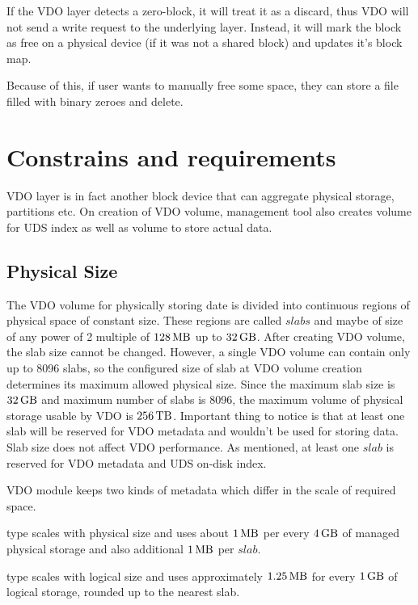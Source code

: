 \documentclass[
  color, %
  table, %
  lof,   %
  lot,   %
]{fithesis3}
\begin{document}
If the VDO layer detects a zero-block, it will treat it as a discard, thus VDO will not send a write request to the underlying layer. Instead, it will mark the block as free on a physical device (if it was not a shared block) and updates it's block map.

Because of this, if user wants to manually free some space, they can store a file filled with binary zeroes and delete.


\section{Constrains and requirements}
VDO layer is in fact another block device that can aggregate physical storage, partitions etc. On creation of VDO volume, management tool also creates volume for UDS index as well as volume to store actual data.

\subsection{Physical Size}
The VDO volume for physically storing date is divided into continuous regions of physical space of constant size. These regions are called $slabs$ and maybe of size of any power of 2 multiple of $\SI{128}{\mega\byte}$  up to $\SI{32}{\giga\byte}$. After creating VDO volume, the slab size cannot be changed. However, a single VDO volume can contain only up to 8096 slabs, so the configured size of slab at VDO volume creation determines its maximum allowed physical size. Since the maximum slab size is $\SI{32}{\giga\byte}$ and maximum number of slabs is 8096, the maximum volume of physical storage usable by VDO is $\SI{256}{\tera\byte}$. Important thing to notice is that at least one slab will be reserved for VDO metadata and wouldn't be used for storing data. Slab size does not affect VDO performance. As mentioned, at least one $slab$ is reserved for VDO metadata and UDS on-disk index.

VDO module keeps two kinds of metadata which differ in the scale of required space.~\cite{man:requierements}
\begin{compactenum}
\item type scales with physical size and uses about $\SI{1}{\mega\byte}$ per every $\SI{4}{\giga\byte}$ of managed physical storage and also additional $\SI{1}{\mega\byte}$ per $slab$. 
\item type scales with logical size and uses approximately $\SI{1.25}{\mega\byte}$ for every $\SI{1}{\giga\byte}$ of logical storage, rounded up to the nearest slab.
\end{compactenum}
\end{document}
